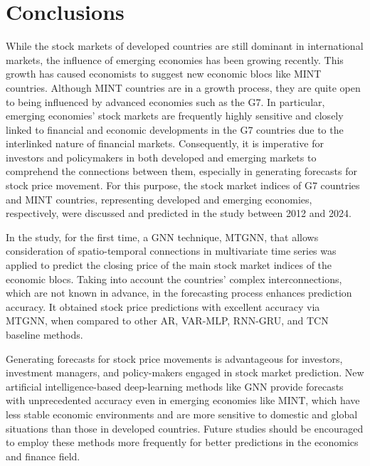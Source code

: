 \section{Conclusions}
\label{sec:conclusion}

While the stock markets of developed countries are still dominant in international markets, the influence of emerging economies has been growing recently. This growth has caused economists to suggest new economic blocs like MINT countries. Although MINT countries are in a growth process, they are quite open to being influenced by advanced economies such as the G7. In particular, emerging economies' stock markets are frequently highly sensitive and closely linked to financial and economic developments in the G7 countries due to the interlinked nature of financial markets. Consequently, it is imperative for investors and policymakers in both developed and emerging markets to comprehend the connections between them, especially in generating forecasts for stock price movement. For this purpose, the stock market indices of G7 countries and MINT countries, representing developed and emerging economies, respectively, were discussed and predicted in the study between 2012 and 2024. 

In the study, for the first time, a GNN technique, MTGNN, that allows consideration of spatio-temporal connections in multivariate time series was applied to predict the closing price of the main stock market indices of the economic blocs. Taking into account the countries' complex interconnections, which are not known in advance, in the forecasting process enhances prediction accuracy. It obtained stock price predictions with excellent accuracy via MTGNN, when compared to other AR, VAR-MLP, RNN-GRU, and TCN baseline methods.

Generating forecasts for stock price movements is advantageous for investors, investment managers, and policy-makers engaged in stock market prediction. New artificial intelligence-based deep-learning methods like GNN provide forecasts with unprecedented accuracy even in emerging economies like MINT, which have less stable economic environments and are more sensitive to domestic and global situations than those in developed countries. Future studies should be encouraged to employ these methods more frequently for better predictions in the economics and finance field.

